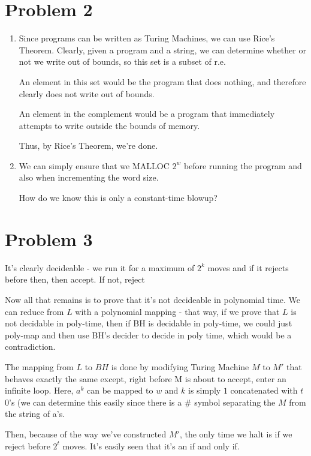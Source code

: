 \documentclass{article}
\begin{document}
\section*{Problem 2}
\begin{enumerate}[label=(\alph*)]
\item 
Since programs can be written as Turing Machines, we can use Rice's Theorem. Clearly, given a program and a string, we can determine whether or not we write out of bounds, so this set is a subset of r.e. 

An element in this set would be the program that does nothing, and therefore clearly does not write out of bounds.

An element in the complement would be a program that immediately attempts to write outside the bounds of memory.

Thus, by Rice's Theorem, we're done.


\item
We can simply ensure that we MALLOC $2^w$ before running the program and also when incrementing the word size.

How do we know this is only a constant-time blowup? 


\end{enumerate}  
 
  
 
\section*{Problem 3}
It's clearly decideable - we run it for a maximum of $2^k$ moves and if it rejects before then, then accept. If not, reject

Now all that remains is to prove that it's not decideable in polynomial time.
We can reduce from $L$ with a polynomial mapping - that way, if we prove that $L$ is not decidable in poly-time, then if BH is decidable in poly-time, we could just poly-map and then use BH's decider to decide in poly time, which would be a contradiction.

The mapping from $L$ to $BH$ is done by modifying Turing Machine $M$ to $M'$ that behaves exactly the same except, right before M is about to accept, enter an infinite loop. Here, $a^k$ can be mapped to $w$ and $k$ is simply $1$ concatenated with $t$ 0's (we can determine this easily since there is a $\#$ symbol separating the $M$ from the string of a's. 

Then, because of the way we've constructed $M'$, the only time we halt is if we reject before $2^t$ moves. It's easily seen that it's an if and only if.
\end{document}
